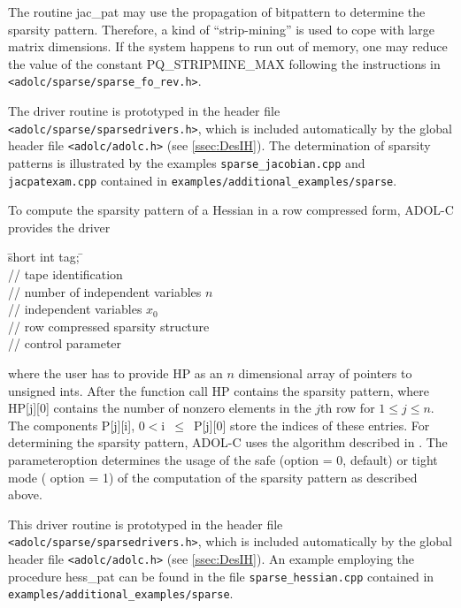\documentclass[11pt,twoside]{article}
\begin{document}
The routine {\sf jac\_pat} may use the propagation of bitpattern to
determine the sparsity pattern. Therefore, a kind of ``strip-mining'' 
is used to cope with large matrix dimensions. If the system happens to run out of memory, one may reduce 
the value of the constant {\sf PQ\_STRIPMINE\_MAX}
following the instructions in \verb=<adolc/sparse/sparse_fo_rev.h>=.

The driver routine is prototyped in the header file
\verb=<adolc/sparse/sparsedrivers.h>=, which is included automatically by the
global header file \verb=<adolc/adolc.h>= (see 
\autoref{ssec:DesIH}). The determination of sparsity patterns is
illustrated by the examples \verb=sparse_jacobian.cpp=
and \verb=jacpatexam.cpp=
contained in 
\verb=examples/additional_examples/sparse=.

To compute the sparsity pattern of a Hessian in a row compressed form, ADOL-C provides the
driver
\begin{tabbing}
\hspace{0.5in}\={\sf short int tag;} \hspace{1.3in}\= \kill    %
\\
       \> // tape identification \\
               \> // number of independent variables $n$\\
         \> // independent variables $x_0$\\
 \> // row compressed sparsity structure\\
          \> // control parameter
\end{tabbing}
where the user has to provide {\sf HP} as an $n$ dimensional array of pointers to {\sf
 unsigned int}s. 
After the function call {\sf HP} contains the sparsity pattern,
where {\sf HP[j][0]} contains the number of nonzero elements in the
 $j$th row for $1 \le j\le n$. 
The components {\sf P[j][i]}, $0<${\sf i}~$\le$~{\sf P[j][0]} store the
 indices of these entries. For determining the sparsity pattern, ADOL-C uses
 the algorithm described in \cite{Wa05a}.  The parameter{\sf option} determines
the usage of the safe ({\sf option = 0}, default) or tight mode ({\sf
  option = 1}) of the computation of the sparsity pattern as described
above.

This driver routine is prototyped in the header file
\verb=<adolc/sparse/sparsedrivers.h>=, which is included automatically by the
global header file \verb=<adolc/adolc.h>= (see \autoref{ssec:DesIH}).
An example employing the procedure {\sf hess\_pat}  can be found in the file
\verb=sparse_hessian.cpp=  contained in 
\verb=examples/additional_examples/sparse=.
%
\end{document}
